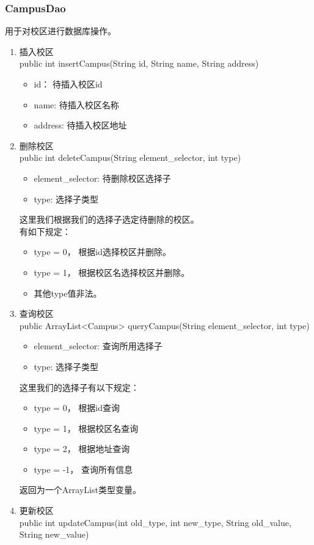\documentclass[../report.tex]{subfiles}
\begin{document}
\subsubsection{CampusDao}
用于对校区进行数据库操作。
\begin{enumerate}
\ttfamily 
\item 插入校区\\
public int insertCampus(String id, String name, String address)
\begin{itemize}
\item id： 待插入校区id
\item name: 待插入校区名称
\item address: 待插入校区地址
\end{itemize}


\item 删除校区\\
public int deleteCampus(String element\_selector, int type)
\begin{itemize}
\item element\_selector: 待删除校区选择子
\item type: 选择子类型
\end{itemize}
这里我们根据我们的选择子选定待删除的校区。\\
有如下规定：
\begin{itemize}
\item type = 0， 根据id选择校区并删除。
\item type = 1， 根据校区名选择校区并删除。
\item 其他type值非法。
\end{itemize}

\item 查询校区\\
public ArrayList<Campus> queryCampus(String element\_selector, int type)
\begin{itemize}
\item element\_selector: 查询所用选择子
\item type: 选择子类型
\end{itemize}
这里我们的选择子有以下规定：
\begin{itemize}
\item type = 0， 根据id查询
\item type = 1， 根据校区名查询
\item type = 2， 根据地址查询
\item type = -1， 查询所有信息
\end{itemize}
返回为一个ArrayList类型变量。

\item 更新校区\\
public int updateCampus(int old\_type, int new\_type, String old\_value, String new\_value)

\end{enumerate}
\end{document}
